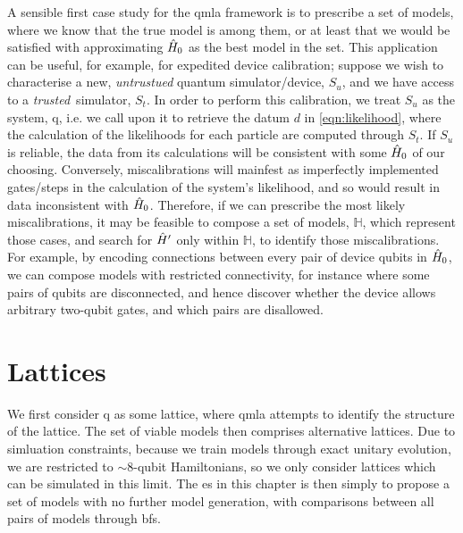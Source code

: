 \glsresetall
A sensible first case study for the \gls{qmla} framework is to prescribe a set of models, 
    where we know that the \gls{true model} is among them, or at least that we would be satisfied with 
    approximating $\hat{H}_0$ as the best model in the set. 
This application can be useful, for example, for expedited device calibration; 
    suppose we wish to characterise a new, \emph{untrustued} quantum simulator/device, $S_u$, 
    and we have access to a \emph{trusted}\footnotemark \  simulator, $S_t$. 
In order to perform this calibration, 
    we treat $S_u$ as the system, \gls{q}, i.e. we call upon it to retrieve the datum $d$ in \cref{eqn:likelihood}, 
    where the calculation of the \glspl{likelihood}  for each particle are computed through $S_t$. 
If $S_u$ is reliable, the data from its calculations will be consistent with some $\hat{H}_0$ of our choosing. 
Conversely, miscalibrations will mainfest as imperfectly implemented gates/steps in the calculation of the system's likelihood, 
    and so would result in data inconsistent with $\hat{H}_0$. 
Therefore, if we can prescribe the most likely miscalibrations, it may be feasible to compose a set 
    of models, $\mathbb{H}$, which represent those cases, and search for $\hat{H}^{\prime}$ only within $\mathbb{H}$,
    to identify those miscalibrations. 
For example, by encoding connections between every pair of device qubits in $\hat{H}_0$, 
    we can compose models with restricted connectivity, for instance where some pairs of qubits are disconnected, 
    and hence discover whether the device allows arbitrary two-qubit gates, 
    and which pairs are disallowed. 

\section{Lattices}\label{sec:lattices}
We first consider \gls{q} as some lattice, where \gls{qmla} attempts to identify the structure of the lattice. 
The set of viable models then comprises alternative lattices.
Due to simluation constraints, because we train models through exact unitary evolution, 
    we are restricted to $\sim8$-qubit Hamiltonians, so we only consider lattices which can 
    be simulated in this limit. 
The \gls{es} in this chapter is then simply to propose a set of models with no further model generation, 
    with comparisons between all pairs of models through \glspl{bf}.
\par

